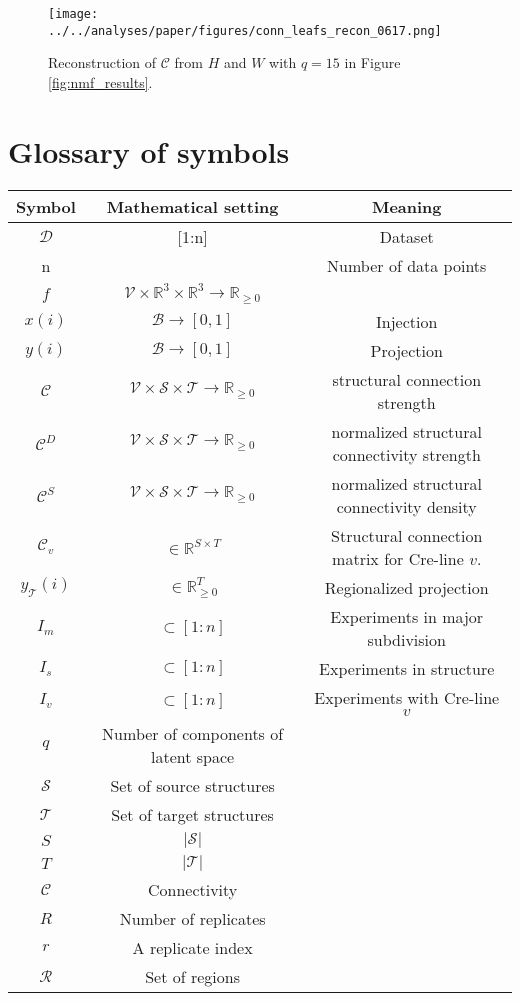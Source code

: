 \begin{figure}[H]
    \centering
    \texttt{[image: ../../analyses/paper/figures/conn\_leafs\_recon\_0617.png]} 
    \label{fig:distances}
    \caption{Reconstruction of $\mathcal C$ from $H$ and $W$ with $q=15$ in Figure \ref{fig:nmf_results}.}
\end{figure}


\newpage

\section{Glossary of symbols}

\begin{table}
\small
\begin{tabular}{c|c|c }
Symbol & Mathematical setting & Meaning \\
\hline
$\mathcal D$ & [1:n] & Dataset \\
n & & Number of data points \\
$f$ & $\mathcal V \times \mathbb R^3 \times \mathbb R^3 \to \mathbb R_{\geq 0} $ \\
$x(i)$ & $\mathcal B \to [0,1] $ & Injection \\ 
$y(i)$ & $\mathcal B \to [0,1]$ & Projection \\
$\mathcal C$ & $\mathcal V \times \mathcal S \times \mathcal T \to \mathbb R_{\geq 0}$  & structural connection strength\\
$\mathcal C^D$ & $\mathcal V \times \mathcal S \times \mathcal T \to \mathbb R_{\geq 0}$  & normalized structural connectivity strength\\
$\mathcal C^S$ & $\mathcal V \times \mathcal S \times \mathcal T \to \mathbb R_{\geq 0}$  & normalized structural connectivity density\\
$\mathcal C_v$ & $\in \mathbb R^{S \times T} $& Structural connection matrix for Cre-line $v$. \\
$y_{\mathcal T} (i)$ &$ \in \mathbb R_{\geq 0}^T$ & Regionalized projection \\
$I_m$ & $\subset [1:n]$ & Experiments in major subdivision \\
$I_s$ & $\subset [1:n]$ & Experiments in structure \\
$I_v$ &  $\subset [1:n]$ & Experiments with Cre-line $v$ \\
$q$ & Number of components of latent space \\
$\mathcal S$ & Set of source structures \\
$\mathcal T$ & Set of target structures \\
$S$ & $|\mathcal S|$ \\ 
$T$ & $|\mathcal T|$ \\ 
$\mathcal C$ & Connectivity \\
$R$ & Number of replicates \\
$r$ & A replicate index \\
$\mathcal R$ & Set of regions
\end{tabular}
\end{table}


